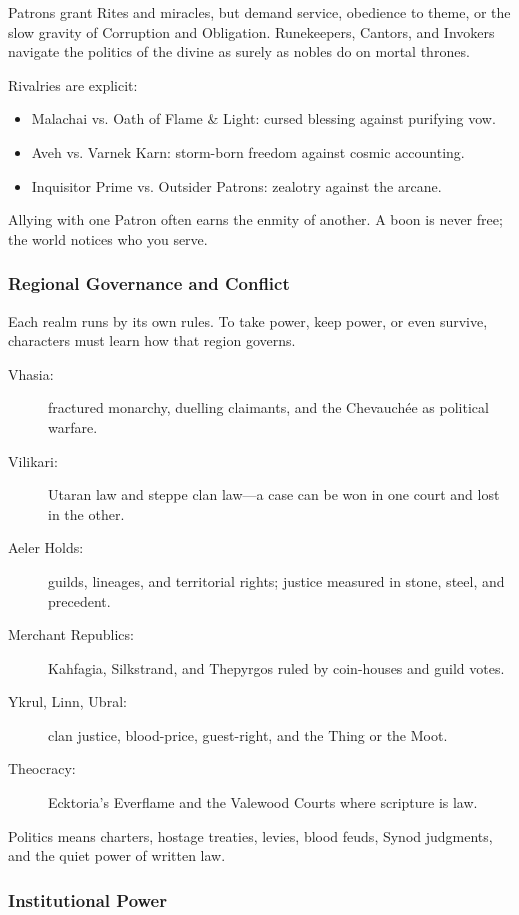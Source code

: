 Patrons grant Rites and miracles, but demand service, obedience to theme, or the slow gravity of Corruption and Obligation. Runekeepers, Cantors, and Invokers navigate the politics of the divine as surely as nobles do on mortal thrones.

Rivalries are explicit:
\begin{itemize}
    \item Malachai vs. Oath of Flame \& Light: cursed blessing against purifying vow.
    \item Aveh vs. Varnek Karn: storm-born freedom against cosmic accounting.
    \item Inquisitor Prime vs. Outsider Patrons: zealotry against the arcane.
\end{itemize}
Allying with one Patron often earns the enmity of another. A boon is never free; the world notices who you serve.

\subsubsection{Regional Governance and Conflict}

Each realm runs by its own rules. To take power, keep power, or even survive, characters must learn how that region governs.

\begin{description}
    \item[Vhasia:] fractured monarchy, duelling claimants, and the Chevauchée as political warfare.
    \item[Vilikari:] Utaran law and steppe clan law---a case can be won in one court and lost in the other.
    \item[Aeler Holds:] guilds, lineages, and territorial rights; justice measured in stone, steel, and precedent.
    \item[Merchant Republics:] Kahfagia, Silkstrand, and Thepyrgos ruled by coin-houses and guild votes.
    \item[Ykrul, Linn, Ubral:] clan justice, blood-price, guest-right, and the Thing or the Moot.
    \item[Theocracy:] Ecktoria's Everflame and the Valewood Courts where scripture is law.
\end{description}
Politics means charters, hostage treaties, levies, blood feuds, Synod judgments, and the quiet power of written law.

\subsubsection{Institutional Power}

